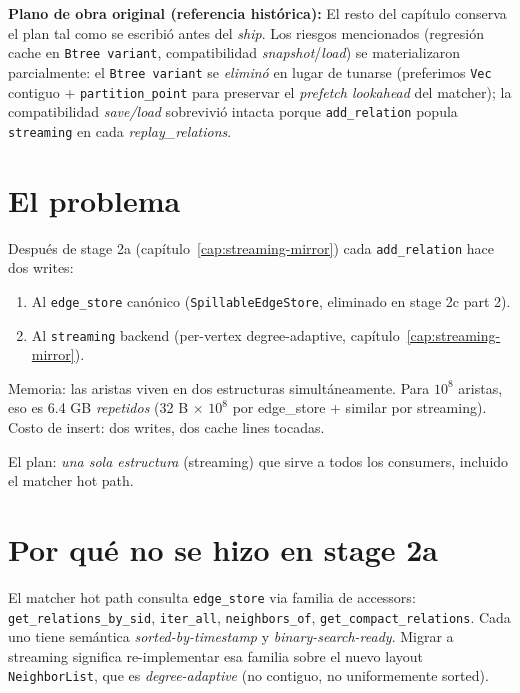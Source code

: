 \textbf{Plano de obra original (referencia histórica):} El resto
del capítulo conserva el plan tal como se escribió antes del
\emph{ship}. Los riesgos mencionados (regresión cache en
\texttt{Btree variant}, compatibilidad \emph{snapshot}/\emph{load})
se materializaron parcialmente: el \texttt{Btree variant} se
\emph{eliminó} en lugar de tunarse (preferimos \texttt{Vec}
contiguo + \texttt{partition\_point} para preservar el
\emph{prefetch lookahead} del matcher); la compatibilidad
\emph{save/load} sobrevivió intacta porque \texttt{add\_relation}
popula \texttt{streaming} en cada \emph{replay\_relations}.

\section{El problema}

Después de stage 2a (capítulo~\ref{cap:streaming-mirror}) cada
\texttt{add\_relation} hace dos writes:

\begin{enumerate}
    \item Al \texttt{edge\_store} canónico (\texttt{SpillableEdgeStore},
    eliminado en stage 2c part 2).
    \item Al \texttt{streaming} backend (per-vertex degree-adaptive,
    capítulo~\ref{cap:streaming-mirror}).
\end{enumerate}

\noindent
Memoria: las aristas viven en dos estructuras simultáneamente. Para
\(10^8\) aristas, eso es 6.4 GB \emph{repetidos} (32 B \(\times\)
\(10^8\) por edge\_store + similar por streaming). Costo de
insert: dos writes, dos cache lines tocadas.

El plan: \emph{una sola estructura} (streaming) que sirve a todos
los consumers, incluido el matcher hot path.

\section{Por qué no se hizo en stage 2a}

El matcher hot path consulta \texttt{edge\_store} via familia de
accessors: \texttt{get\_relations\_by\_sid},
\texttt{iter\_all}, \texttt{neighbors\_of},
\texttt{get\_compact\_relations}. Cada uno tiene semántica
\emph{sorted-by-timestamp} y \emph{binary-search-ready}. Migrar a
streaming significa re-implementar esa familia sobre el nuevo
layout \texttt{NeighborList}, que es \emph{degree-adaptive} (no
contiguo, no uniformemente sorted).

